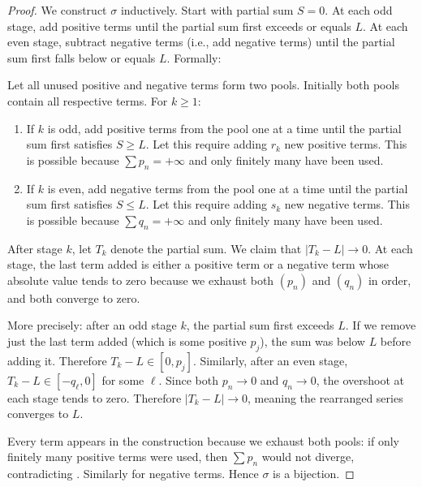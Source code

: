 \begin{proof}
    We construct $\sigma$ inductively. Start with partial sum $S = 0$. At each odd stage, add positive terms until the partial sum first exceeds or equals $L$. At each even stage, subtract negative terms (i.e., add negative terms) until the partial sum first falls below or equals $L$. Formally:

    Let all unused positive and negative terms form two pools. Initially both pools contain all respective terms. For $k \geq 1$:
    \begin{enumerate}
        \item If $k$ is odd, add positive terms from the pool one at a time until the partial sum first satisfies $S \geq L$. Let this require adding $r_k$ new positive terms. This is possible because $\sum p_n = +\infty$ and only finitely many have been used.
        \item If $k$ is even, add negative terms from the pool one at a time until the partial sum first satisfies $S \leq L$. Let this require adding $s_k$ new negative terms. This is possible because $\sum q_n = +\infty$ and only finitely many have been used.
    \end{enumerate}

    After stage $k$, let $T_k$ denote the partial sum. We claim that $|T_k - L| \to 0$. At each stage, the last term added is either a positive term or a negative term whose absolute value tends to zero because we exhaust both $(p_n)$ and $(q_n)$ in order, and both converge to zero.

    More precisely: after an odd stage $k$, the partial sum first exceeds $L$. If we remove just the last term added (which is some positive $p_{j}$), the sum was below $L$ before adding it. Therefore $T_k - L \in [0, p_j]$. Similarly, after an even stage, $T_k - L \in [-q_\ell, 0]$ for some $\ell$. Since both $p_n \to 0$ and $q_n \to 0$, the overshoot at each stage tends to zero. Therefore $|T_k - L| \to 0$, meaning the rearranged series converges to $L$.

    Every term appears in the construction because we exhaust both pools: if only finitely many positive terms were used, then $\sum p_n$ would not diverge, contradicting . Similarly for negative terms. Hence $\sigma$ is a bijection.
\end{proof}
